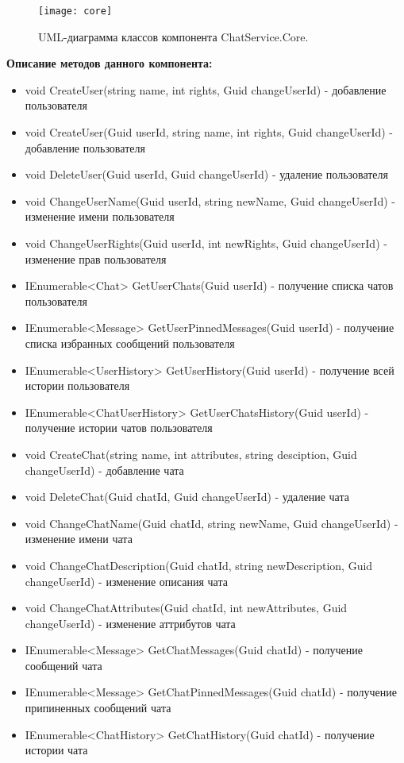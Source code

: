 \begin{figure}[H]
	\centering
	\texttt{[image: core]}
	\caption{UML-диаграмма классов компонента ChatService.Core. }
	\label{img:core}
\end{figure}

\textbf{Описание методов данного компонента:}
\begin{itemize}
\item void CreateUser(string name, int rights, Guid changeUserId) - добавление пользователя
\item void CreateUser(Guid userId, string name, int rights, Guid changeUserId) - добавление пользователя
\item void DeleteUser(Guid userId, Guid changeUserId) - удаление пользователя
\item void ChangeUserName(Guid userId, string newName, Guid changeUserId) - изменение имени пользователя
\item void ChangeUserRights(Guid userId, int newRights, Guid changeUserId) - изменение прав пользователя
\item IEnumerable<Chat> GetUserChats(Guid userId) - получение списка чатов пользователя
\item IEnumerable<Message> GetUserPinnedMessages(Guid userId) - получение списка избранных сообщений пользователя
\item IEnumerable<UserHistory> GetUserHistory(Guid userId) - получение всей истории пользователя
\item IEnumerable<ChatUserHistory> GetUserChatsHistory(Guid userId) - получение истории чатов пользователя
\item void CreateChat(string name, int attributes, string desciption, Guid changeUserId) - добавление чата
\item void DeleteChat(Guid chatId, Guid changeUserId) - удаление чата
\item void ChangeChatName(Guid chatId, string newName, Guid changeUserId) - изменение имени чата
\item void ChangeChatDescription(Guid chatId, string newDescription, Guid changeUserId) - изменение описания чата
\item void ChangeChatAttributes(Guid chatId, int newAttributes, Guid changeUserId) - изменение аттрибутов чата
\item IEnumerable<Message> GetChatMessages(Guid chatId) - получение сообщений чата
\item IEnumerable<Message> GetChatPinnedMessages(Guid chatId) - получение припиненных сообщений чата
\item IEnumerable<ChatHistory> GetChatHistory(Guid chatId) - получение истории чата

\end{itemize}
